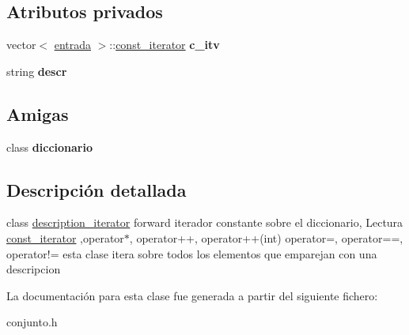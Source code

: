 \subsection*{Atributos privados}
\begin{DoxyCompactItemize}
\item 
\hypertarget{classconjunto_1_1description__iterator_a9ec42a803fa4ad969df520fd02e4adb3}{}vector$<$ \hyperlink{classconjunto_a09cad766dd65de73e51eae21f9d22585}{entrada} $>$\+::\hyperlink{classconjunto_1_1const__iterator}{const\+\_\+iterator} {\bfseries c\+\_\+itv}\label{classconjunto_1_1description__iterator_a9ec42a803fa4ad969df520fd02e4adb3}

\item 
\hypertarget{classconjunto_1_1description__iterator_a3af23f14ec44378308e577ba8c9c71e0}{}string {\bfseries descr}\label{classconjunto_1_1description__iterator_a3af23f14ec44378308e577ba8c9c71e0}

\end{DoxyCompactItemize}
\subsection*{Amigas}
\begin{DoxyCompactItemize}
\item 
\hypertarget{classconjunto_1_1description__iterator_a44955070f60117521fa6b406a83e6d4d}{}class {\bfseries diccionario}\label{classconjunto_1_1description__iterator_a44955070f60117521fa6b406a83e6d4d}

\end{DoxyCompactItemize}


\subsection{Descripción detallada}
class \hyperlink{classconjunto_1_1description__iterator}{description\+\_\+iterator} forward iterador constante sobre el diccionario, Lectura \hyperlink{classconjunto_1_1const__iterator}{const\+\_\+iterator} ,operator$\ast$, operator++, operator++(int) operator=, operator==, operator!= esta clase itera sobre todos los elementos que emparejan con una descripcion 

La documentación para esta clase fue generada a partir del siguiente fichero\+:\begin{DoxyCompactItemize}
\item 
conjunto.\+h\end{DoxyCompactItemize}
